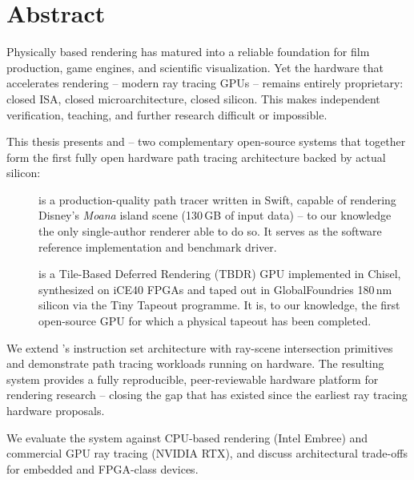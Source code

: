 \chapter*{Abstract}

Physically based rendering has matured into a reliable foundation for
film production, game engines, and scientific visualization.
Yet the hardware that accelerates rendering -- modern ray tracing GPUs --
remains entirely proprietary: closed ISA, closed microarchitecture,
closed silicon.
This makes independent verification, teaching, and further research
difficult or impossible.

This thesis presents \gonzales{} and \borg{} -- two complementary
open-source systems that together form the first fully open hardware
path tracing architecture backed by actual silicon:

\medskip
\begin{description}
  \item[\gonzales{}] is a production-quality path tracer written in Swift,
    capable of rendering Disney's \emph{Moana} island scene
    (130\,GB of input data) -- to our knowledge the only single-author
    renderer able to do so.
    It serves as the software reference implementation and benchmark driver.

  \item[\borg{}] is a Tile-Based Deferred Rendering (TBDR) GPU
    implemented in Chisel, synthesized on iCE40 FPGAs and taped out in
    GlobalFoundries 180\,nm silicon via the Tiny Tapeout programme.
    It is, to our knowledge, the first open-source GPU
    for which a physical tapeout has been completed.
\end{description}

\medskip
We extend \borg{}'s instruction set architecture with ray-scene
intersection primitives and demonstrate path tracing workloads
running on \borg{} hardware.
The resulting system provides a fully reproducible, peer-reviewable
hardware platform for rendering research -- closing the gap that has
existed since the earliest ray tracing hardware proposals.

We evaluate the system against CPU-based rendering (Intel Embree) and
commercial GPU ray tracing (NVIDIA RTX), and discuss architectural
trade-offs for embedded and FPGA-class devices.
